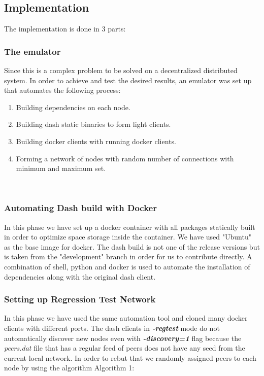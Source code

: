 \documentclass[conference]{IEEEtran}
\begin{document}
\subsection{Implementation}

The implementation is done in 3 parts: \\

\subsubsection{The emulator}
Since this is a complex problem to be solved on a decentralized distributed
system. In order to achieve and test the desired results, an emulator was set up
that automates the following process: \\

\begin{enumerate}[label=(\alph*)]
    \item Building dependencies on each node.
    \item Building dash static binaries to form light clients.
    \item Building docker clients with running docker clients.
    \item Forming a network of nodes with random number of connections with
        minimum and maximum set.
\end{enumerate}
\\
\subsubsection{Automating Dash build with Docker}
In this phase we have set up a docker container with all packages statically
built in order to optimize space storage inside the container. We have
used "Ubuntu" as the base image for docker. The dash build is not one of the
release versions but is taken from the "development" branch in order for us to
contribute directly. A combination of shell, python and docker is used to
automate the installation of dependencies along with the original dash client. \\

\subsubsection{Setting up Regression Test Network}
In this phase we have used the same automation tool and cloned many docker
clients with different ports. The dash clients in \textbf{\textit{-regtest}}
mode do not automatically discover new nodes even with
\textbf{\textit{-discovery=1}} flag because the \textit{peers.dat} file that has
a regular feed of peers does not have any seed from the current local network.
In order to rebut that we randomly assigned peers to each node by using the
algorithm Algorithm 1: 
\end{document}
